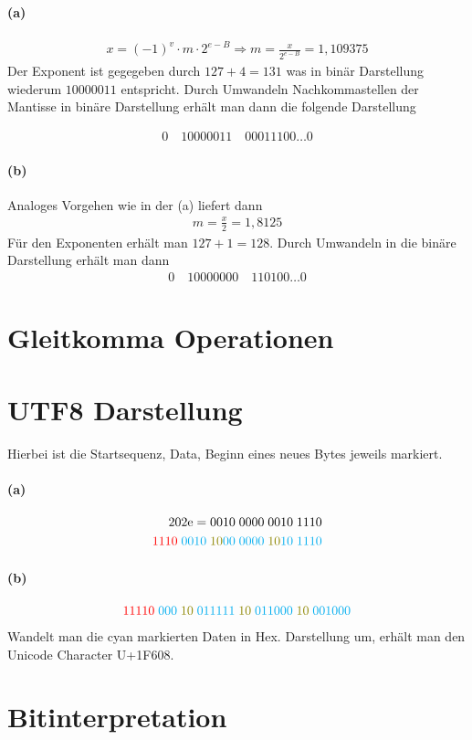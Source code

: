 \documentclass[a4paper]{article}
\begin{document}
\paragraph{(a)}
\begin{align*}
    x=(-1)^v\cdot m \cdot2^{e-B} \Rightarrow m=\frac{x}{2^{e-B}}=1,109375
\end{align*}
Der Exponent ist gegegeben durch $127+4=131$ was in binär Darstellung wiederum $10000011$ entspricht. Durch Umwandeln Nachkommastellen der Mantisse in binäre Darstellung erhält man dann die folgende Darstellung

\begin{align*}
    0 \quad 10000011 \quad 00011100\dots 0
\end{align*}

\paragraph{(b)}
Analoges Vorgehen wie in der (a) liefert dann
\begin{align*}
    m=\frac{x}{2}=1,8125
\end{align*}
Für den Exponenten erhält man $127+1=128$. Durch Umwandeln in die binäre Darstellung erhält man dann
\begin{align*}
    0 \quad 10000000 \quad 110100\dots 0
\end{align*}


\section{Gleitkomma Operationen}


\section{UTF8 Darstellung}
Hierbei ist die \color{red} Startsequenz, \color{cyan} Data, \color{olive} Beginn eines neues Bytes \color{black} jeweils markiert. 
\paragraph{(a)}
\begin{align*}
    \text{202e}=0010\;0000\;0010\;1110\\
    \color{red}1110\;\color{cyan}0010\;\color{olive}10\color{cyan}00\;0000\;\color{olive}10\color{cyan}10\;1110\\
\end{align*}


\paragraph{(b)}
\begin{align*}
    \color{red}11110\; \color{cyan} 000\; \color{olive}10\; \color{cyan}011111\; \color{olive}10\;\color{cyan}011000\; \color{olive}10 \;\color{cyan} 001000\\
\end{align*}
Wandelt man die \color{cyan}cyan \color{black} markierten Daten in Hex. Darstellung um, erhält man den Unicode Character U+1F608.

\section{Bitinterpretation}
\end{document}
